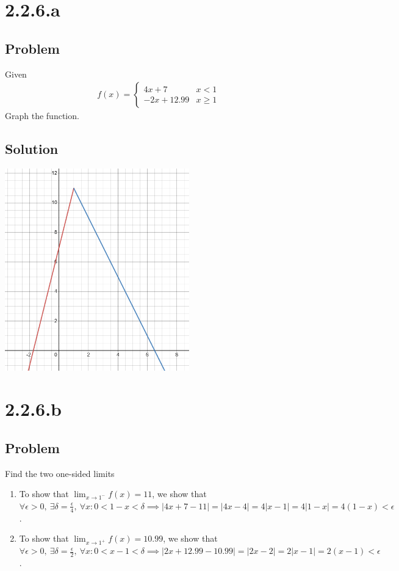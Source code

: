 \documentclass[12pt]{article}
\newcommand{\abs}  [1]{\left|       #1 \right|      }
\begin{document}
\section*{2.2.6.a}

\subsection*{Problem}
Given
\begin{align*}
    f(x) = \begin{cases}
        4x + 7 & x < 1 \\
        -2x + 12.99 & x \geq 1
    \end{cases}
\end{align*}
Graph the function.

\subsection*{Solution}
\begin{center}
\includegraphics[width=8cm]{2.2.6}
\end{center}



\section*{2.2.6.b}

\subsection*{Problem}
Find the two one-sided limits

\begin{enumerate}
    \item To show that $\lim_{x \to 1^{-}} f(x) = 11$, we show that $\forall \epsilon > 0,\ \exists \delta = \frac{\epsilon}{4},\ \forall x : 0 < 1 - x < \delta \implies \abs{4x + 7 - 11} = \abs{4x - 4} = 4\abs{x - 1} = 4 \abs{1 - x} = 4 (1 - x) < \epsilon$.
    \item To show that $\lim_{x \to 1^{+}} f(x) = 10.99$, we show that $\forall \epsilon > 0,\ \exists \delta = \frac{\epsilon}{2},\ \forall x : 0 < x - 1 < \delta \implies \abs{2x + 12.99 - 10.99} = \abs{2x - 2} = 2\abs{x - 1} = 2(x - 1) < \epsilon$.
\end{enumerate}
\end{document}
